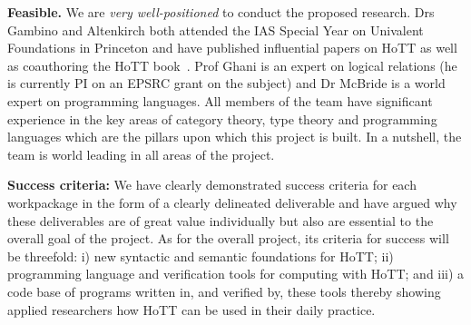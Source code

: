 \documentclass[a4paper,11pt]{article}
\begin{document}
\vspace*{0.02in}

{\bf Feasible.} We are {\em very well-positioned} to conduct the
proposed research. Drs Gambino and Altenkirch both attended the IAS
Special Year on Univalent Foundations in Princeton and have published
influential papers on HoTT as well as coauthoring the HoTT book~\cite{hott-book}. Prof
Ghani is an expert on logical relations (he is currently PI on an
EPSRC grant on the subject) and Dr McBride is a world expert on
programming languages. All members of the team have significant
experience in the key areas of category theory, type theory and
programming languages which are the pillars upon which this project is
built. In a nutshell, the team is world leading in all areas of the
project.

\vspace*{0.02in}

{\bf Success criteria:} We have clearly demonstrated success criteria
for each workpackage in the form of a clearly delineated deliverable
and have argued why these deliverables are of great value individually
but also are essential to the overall goal of the project. As for the
overall project, its criteria for success will be threefold: i) new
syntactic and semantic foundations for HoTT; ii) programming language
and verification tools for computing with HoTT; and iii) a code base
of programs written in, and verified by, these tools thereby showing
applied researchers how HoTT can be used in their daily practice.


\vspace*{0.02in}
\end{document}
